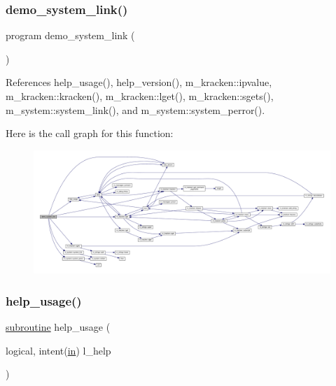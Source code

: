 \subsubsection{\texorpdfstring{demo\+\_\+system\+\_\+link()}{demo\_system\_link()}}
{\footnotesize\ttfamily program demo\+\_\+system\+\_\+link (\begin{DoxyParamCaption}{ }\end{DoxyParamCaption})}



References help\+\_\+usage(), help\+\_\+version(), m\+\_\+kracken\+::ipvalue, m\+\_\+kracken\+::kracken(), m\+\_\+kracken\+::lget(), m\+\_\+kracken\+::sgets(), m\+\_\+system\+::system\+\_\+link(), and m\+\_\+system\+::system\+\_\+perror().

Here is the call graph for this function\+:
\nopagebreak
\begin{figure}[H]
\begin{center}
\leavevmode
\includegraphics[width=350pt]{__ln_8f90_a1b05022af7f0b5c0f963a252a5ef2ce7_cgraph}
\end{center}
\end{figure}
\mbox{\label{__ln_8f90_a3e09a3b52ee8fb04eeb93fe5761626a8}} 
\subsubsection{\texorpdfstring{help\+\_\+usage()}{help\_usage()}}
{\footnotesize\ttfamily \hyperlink{M__stopwatch_83_8txt_acfbcff50169d691ff02d4a123ed70482}{subroutine} help\+\_\+usage (\begin{DoxyParamCaption}\item[{logical, intent(\hyperlink{M__journal_83_8txt_afce72651d1eed785a2132bee863b2f38}{in})}]{l\+\_\+help }\end{DoxyParamCaption})}




